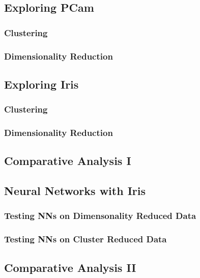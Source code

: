 \documentclass[a4paper]{article}
\begin{document}
\subsection{Exploring PCam}
\subsubsection{Clustering}
\subsubsection{Dimensionality Reduction}
\subsection{Exploring Iris}
\subsubsection{Clustering}
\subsubsection{Dimensionality Reduction}
\subsection{Comparative Analysis I}
\subsection{Neural Networks with Iris}
\subsubsection{Testing NNs on Dimensonality Reduced Data}
\subsubsection{Testing NNs on Cluster Reduced Data}
\subsection{Comparative Analysis II} 
\printbibliography
\end{document}
